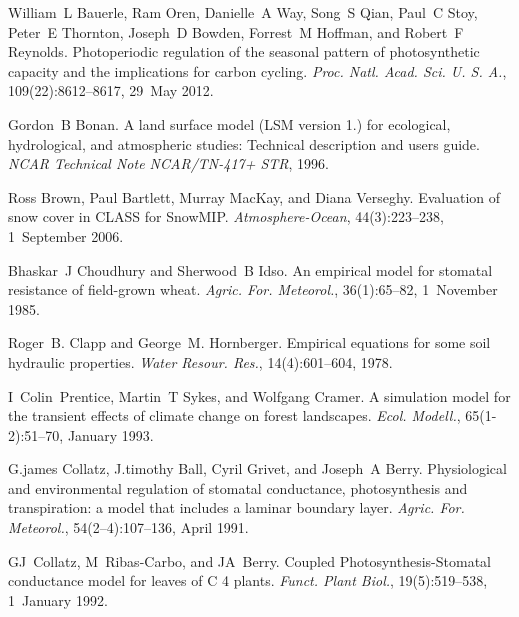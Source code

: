 \begin{DoxyDescription}
\item[\label{_CITEREF_Bauerle2012-c29}%
\mbox{[}16\mbox{]}]William~L Bauerle, Ram Oren, Danielle~A Way, Song~S Qian, Paul~C Stoy, Peter~E Thornton, Joseph~D Bowden, Forrest~M Hoffman, and Robert~F Reynolds. Photoperiodic regulation of the seasonal pattern of photosynthetic capacity and the implications for carbon cycling. {\itshape Proc. Natl. Acad. Sci. U. S. A.}, 109(22)\+:8612--8617, 29~May 2012. 


\item[\label{_CITEREF_Bonan1996-as}%
\mbox{[}17\mbox{]}]Gordon~B Bonan. A land surface model (L\+S\+M version 1.) for ecological, hydrological, and atmospheric studies\+: Technical description and user\textquotesingle{}s guide. {\itshape N\+C\+A\+R Technical Note N\+C\+A\+R/\+T\+N-\/417+ S\+T\+R}, 1996.


\item[\label{_CITEREF_Brown2006-ec}%
\mbox{[}18\mbox{]}]Ross Brown, Paul Bartlett, Murray Mac\+Kay, and Diana Verseghy. Evaluation of snow cover in C\+L\+A\+S\+S for Snow\+M\+I\+P. {\itshape Atmosphere-\/\+Ocean}, 44(3)\+:223--238, 1~September 2006. 


\item[\label{_CITEREF_Choudhury1985-mm}%
\mbox{[}19\mbox{]}]Bhaskar~J Choudhury and Sherwood~B Idso. An empirical model for stomatal resistance of field-\/grown wheat. {\itshape Agric. For. Meteorol.}, 36(1)\+:65--82, 1~November 1985. 


\item[\label{_CITEREF_Clapp1978-898}%
\mbox{[}20\mbox{]}]Roger~B. Clapp and George~M. Hornberger. Empirical equations for some soil hydraulic properties. {\itshape Water Resour. Res.}, 14(4)\+:601--604, 1978. 


\item[\label{_CITEREF_Prentice1993-xn}%
\mbox{[}21\mbox{]}]I~Colin~Prentice, Martin~T Sykes, and Wolfgang Cramer. A simulation model for the transient effects of climate change on forest landscapes. {\itshape Ecol. Modell.}, 65(1-\/2)\+:51--70, January 1993. 


\item[\label{_CITEREF_Collatz1991-5bc}%
\mbox{[}22\mbox{]}]G.\+james Collatz, J.\+timothy Ball, Cyril Grivet, and Joseph~A Berry. Physiological and environmental regulation of stomatal conductance, photosynthesis and transpiration\+: a model that includes a laminar boundary layer. {\itshape Agric. For. Meteorol.}, 54(2–4)\+:107--136, April 1991. 


\item[\label{_CITEREF_Collatz1992-jf}%
\mbox{[}23\mbox{]}]G\+J~Collatz, M~Ribas-\/\+Carbo, and J\+A~Berry. Coupled Photosynthesis-\/\+Stomatal conductance model for leaves of C 4 plants. {\itshape Funct. Plant Biol.}, 19(5)\+:519--538, 1~January 1992. 



\end{DoxyDescription}
